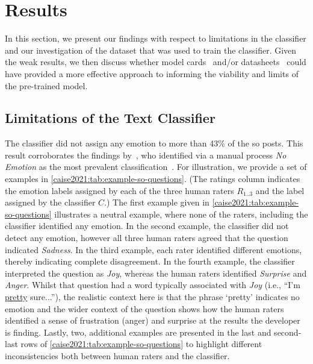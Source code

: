 \section{Results}\label{caise2021:SubSection:Findings}
In this section, we present our findings with respect to limitations in the classifier and our investigation of the dataset that was used to train the classifier. Given the weak results, we then  discuss whether model cards~\citep{Mitchell:2018in} and/or datasheets~\citep{Gebru:2018wh} could have provided a more effective approach to informing the viability and limits of the pre-trained model.

\subsection{Limitations of the Text Classifier}
The classifier did not assign any emotion to more than 43\% of the \gls{so} posts.  This result corroborates the findings by~\citeauthor{murgia2014}, who identified via a manual process \textit{No Emotion} as the most prevalent classification~\citep{murgia2014}. For illustration, we provide a set of examples in \cref{caise2021:tab:example-so-questions}. (The ratings column indicates the emotion labels assigned by each of the three human raters $R_{1..3}$ and the label assigned by the classifier $C$.) 
The first example given in \cref{caise2021:tab:example-so-questions} illustrates a neutral example, where none of the raters, including the classifier identified any emotion.  
In the second example, the classifier did not detect any emotion, however all three human raters agreed that the question indicated \textit{Sadness}. 
In the third example, each rater identified different emotions, thereby indicating complete disagreement.
In the fourth example, the classifier interpreted the question as \textit{Joy}, whereas the human raters identified \textit{Surprise} and \textit{Anger}. Whilst that question had a word typically associated with \textit{Joy} (i.e., ``I'm \uline{pretty} sure...''), the realistic context here is that the phrase `pretty' indicates no emotion and the wider context of the question shows how the human raters identified a sense of frustration (anger) and surprise at the results the developer is finding.
Lastly, two, additional examples are presented in the last and second-last rows of \cref{caise2021:tab:example-so-questions} to highlight different inconsistencies both between human raters and the classifier.

